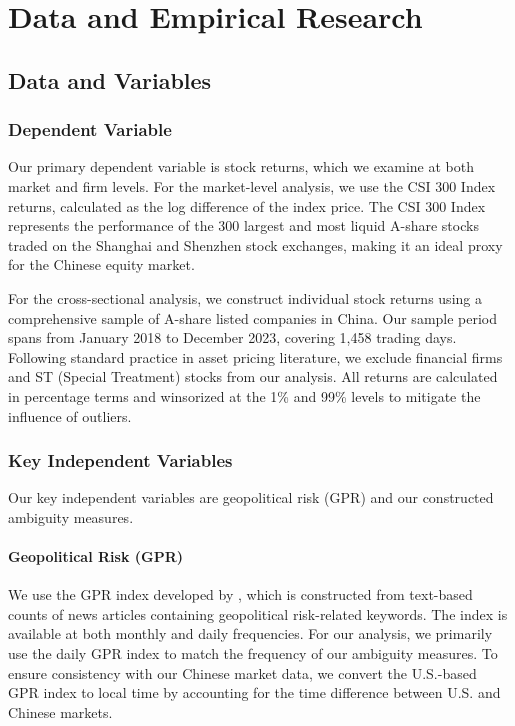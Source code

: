 \documentclass[preprint,12pt,authoryear]{elsarticle}
\begin{document}
\section{Data and Empirical Research}
\label{sec:data}

\subsection{Data and Variables}

\subsubsection{Dependent Variable}

Our primary dependent variable is stock returns, which we examine at both market and firm levels. For the market-level analysis, we use the CSI 300 Index returns, calculated as the log difference of the index price. The CSI 300 Index represents the performance of the 300 largest and most liquid A-share stocks traded on the Shanghai and Shenzhen stock exchanges, making it an ideal proxy for the Chinese equity market.

For the cross-sectional analysis, we construct individual stock returns using a comprehensive sample of A-share listed companies in China. Our sample period spans from January 2018 to December 2023, covering 1,458 trading days. Following standard practice in asset pricing literature, we exclude financial firms and ST (Special Treatment) stocks from our analysis. All returns are calculated in percentage terms and winsorized at the 1\% and 99\% levels to mitigate the influence of outliers.



\subsubsection{Key Independent Variables}

Our key independent variables are geopolitical risk (GPR) and our constructed ambiguity measures.

\paragraph{Geopolitical Risk (GPR)}
We use the GPR index developed by \citet{Caldara2022}, which is constructed from text-based counts of news articles containing geopolitical risk-related keywords. The index is available at both monthly and daily frequencies. For our analysis, we primarily use the daily GPR index to match the frequency of our ambiguity measures. To ensure consistency with our Chinese market data, we convert the U.S.-based GPR index to local time by accounting for the time difference between U.S. and Chinese markets.
\end{document}

